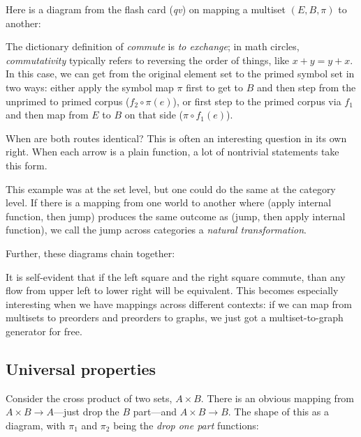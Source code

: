 \documentclass[11pt]{article}
\begin{document}
Here is a diagram
from the flash card ({\em qv}) on mapping a multiset $(E, B, \pi)$ to another:

The dictionary definition of {\em
commute} is {\em to exchange}; in math circles, {\em commutativity} typically refers to
reversing the order of things, like $x+y = y+x$. In this case, we can 
get from the original element set to the primed symbol set in two ways:
either apply the symbol map $\pi$ first to get to $B$ and then step from the unprimed to
primed corpus ($f_2\circ\pi(e)$), or first step to the primed corpus via $f_1$ and then
map from $E$ to $B$ on that side ($\pi\circ f_1(e)$).

When are both routes identical? This is often an interesting question in its own right.
When each arrow is a plain function, a lot of nontrivial statements take this form.

This example was at the set level, but one could do the same at the category level.
If there is a mapping from one world to another where (apply internal function, then jump)
produces the same outcome as (jump, then apply internal function), we call the jump across
categories a {\em natural transformation}.

Further, these diagrams chain together:


It is self-evident that if the left square and the right square commute, than any flow
from upper left to lower right will be equivalent. This becomes especially interesting
when we have mappings across different contexts: if we can map from multisets to preorders
and preorders to graphs, we just got a multiset-to-graph generator for free.

\subsection{Universal properties}
Consider the cross product of two sets, $A\times B$. There is an obvious mapping from
$A\times B \to A$---just drop the $B$ part---and $A\times B \to B$. The shape of this as a
diagram, with $\pi_1$ and $\pi_2$ being the {\em drop one part} functions:

\end{document}
